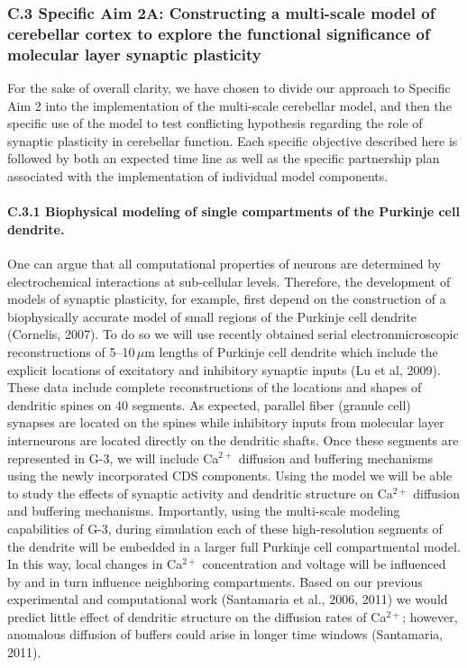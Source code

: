 \documentclass[12pt]{article}
\begin{document}
\subsubsection*{C.3 Specific Aim 2A: Constructing a multi-scale model of cerebellar cortex to explore the functional significance of molecular layer synaptic plasticity}

\noindent For the sake of overall clarity, we have chosen to divide our approach to Specific Aim 2 into the implementation of the multi-scale cerebellar model, and then the specific use of the model to test conflicting hypothesis regarding the role of synaptic plasticity in cerebellar function. Each specific objective described here is followed by both an expected time line as well as the specific partnership plan associated with the implementation of individual model components.

\paragraph{C.3.1 Biophysical modeling of single compartments of the Purkinje cell dendrite.} One can argue that all computational properties of neurons are determined by electrochemical interactions at sub-cellular levels. Therefore, the development of models of synaptic plasticity, for example, first depend on the construction of a biophysically accurate model of small regions of the Purkinje cell dendrite (Cornelis, 2007). To do so we will use recently obtained serial electronmicroscopic reconstructions of 5--10\,$\mu$m lengths of Purkinje cell dendrite which include the explicit locations of excitatory and inhibitory synaptic inputs (Lu et al, 2009). These data include complete reconstructions of the locations and shapes of dendritic spines on 40 segments. As expected, parallel fiber (granule cell) synapses are located on the spines while inhibitory inputs from molecular layer interneurons are located directly on the dendritic shafts. Once these segments are represented in G-3, we will include Ca$^{2+}$ diffusion and buffering mechanisms using the newly incorporated CDS components. Using the model we will be able to study the effects of synaptic activity and dendritic structure on Ca$^{2+}$ diffusion and buffering mechanisms. Importantly, using the multi-scale modeling capabilities of G-3, during simulation each of these high-resolution segments of the dendrite will be embedded in a larger full Purkinje cell compartmental model. In this way, local changes in Ca$^{2+}$ concentration and voltage will be influenced by and in turn influence neighboring compartments. Based on our previous experimental and computational work (Santamaria et al., 2006, 2011) we would predict little effect of dendritic structure on the diffusion rates of Ca$^{2+}$; however, anomalous diffusion of buffers could arise in longer time windows (Santamaria, 2011).
\end{document}
